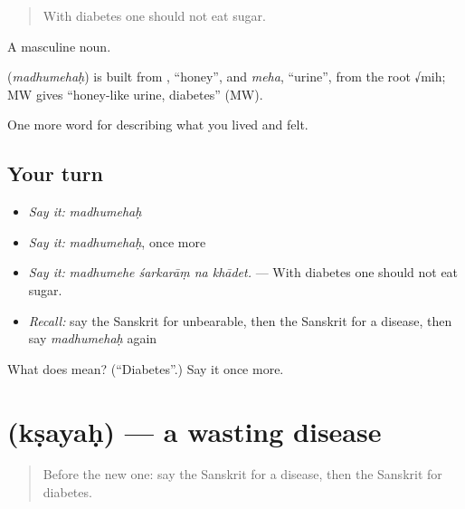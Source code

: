 \begin{quote}
With diabetes one should not eat sugar.
\end{quote}

A masculine noun.

\begin{cousinweb}
\textbf{} (\emph{madhumehaḥ}) is built from \textbf{}, \textquotedblleft{}honey\textquotedblright{}, and \emph{meha}, \textquotedblleft{}urine\textquotedblright{}, from the root √mih; MW gives \textquotedblleft{}honey-like urine, diabetes\textquotedblright{} (MW).
\end{cousinweb}

\begin{grammarlens}[title={What you've built}]
One more word for describing what you lived and felt.
\end{grammarlens}

\subsection*{Your turn}
\begin{itemize}
\raggedright
  \item \emph{Say it:} \emph{madhumehaḥ}
  \item \emph{Say it:} \emph{madhumehaḥ}, once more
  \item \emph{Say it:} \emph{madhumehe śarkarāṃ na khādet.} — With diabetes one should not eat sugar.
  \item \emph{Recall:} say the Sanskrit for unbearable, then the Sanskrit for a disease, then say \emph{madhumehaḥ} again
\end{itemize}

\begin{tcolorbox}[breakable,colback=teal!4,colframe=teal!35!black,title={Before you move on}]
What does  mean? (\textquotedblleft{}Diabetes\textquotedblright{}.) Say it once more.
\end{tcolorbox}
\section[\texorpdfstring{\sk{क्षयः} (kṣayaḥ)}{क्षयः (kṣayaḥ)}]{ (kṣayaḥ) — a wasting disease}

\label{lesson:SA-C479-ksayah}



\begin{quote}
Before the new one: say the Sanskrit for a disease, then the Sanskrit for diabetes.
\end{quote}

